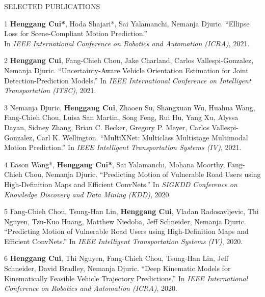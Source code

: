 \documentclass{resume} %
\begin{document}


\begin{rSection}{SELECTED PUBLICATIONS}
\vspace{-.1in}
\footnotesize{
    \item
    [1]
        {\bf Henggang Cui*}, Hoda Shajari*, Sai Yalamanchi, Nemanja Djuric.
        ``Ellipse Loss for Scene-Compliant Motion Prediction.'' \\
        In \emph{IEEE International Conference on Robotics and Automation (ICRA)}, 2021.
    \item
    [2]
        {\bf Henggang Cui}, Fang-Chieh Chou, Jake Charland, Carlos Vallespi-Gonzalez, Nemanja Djuric.
        ``Uncertainty-Aware Vehicle Orientation Estimation for Joint Detection-Prediction Models.''
        In \emph{IEEE International Conference on Intelligent Transportation (ITSC)}, 2021.
    \item
    [3]
        Nemanja Djuric, {\bf Henggang Cui}, Zhaoen Su, Shangxuan Wu, Huahua Wang, Fang-Chieh Chou, Luisa San Martin, Song Feng, Rui Hu, Yang Xu, Alyssa Dayan, Sidney Zhang, Brian C. Becker, Gregory P. Meyer, Carlos Vallespi-Gonzalez, Carl K. Wellington.
        ``MultiXNet: Multiclass Multistage Multimodal Motion Prediction.''
        In \emph{IEEE Intelligent Transportation Systems (IV)}, 2021.
    \item
    [4]
        Eason Wang*, {\bf Henggang Cui*}, Sai Yalamanchi, Mohana Moorthy, Fang-Chieh Chou, Nemanja Djuric.
        ``Predicting Motion of Vulnerable Road Users using High-Definition Maps and Efficient ConvNets.''
        In \emph{SIGKDD Conference on Knowledge Discovery and Data Mining (KDD)}, 2020.
    \item
    [5]
        Fang-Chieh Chou, Tsung-Han Lin, {\bf Henggang Cui}, Vladan Radosavljevic, Thi Nguyen, Tzu-Kuo Huang, Matthew Niedoba, Jeff Schneider, Nemanja Djuric.
        ``Predicting Motion of Vulnerable Road Users using High-Definition Maps and Efficient ConvNets.''
        In \emph{IEEE Intelligent Transportation Systems (IV)}, 2020.
    \item
    [6]
        {\bf Henggang Cui}, Thi Nguyen, Fang-Chieh Chou, Tsung-Han Lin, Jeff Schneider, David Bradley, Nemanja Djuric.
        ``Deep Kinematic Models for Kinematically Feasible Vehicle Trajectory Predictions.''
        In \emph{IEEE International Conference on Robotics and Automation (ICRA)}, 2020.
}
\end{rSection}
\end{document}

